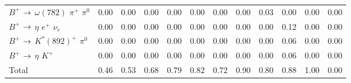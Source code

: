 {\begin{tabular}{lrrrrrrrrrrr}
$B^{+}$ $\rightarrow$ $\omega(782)$ $\pi^{+}$ $\pi^{0}$                      &         0.00 &         0.00 &         0.00 &         0.00 &         0.00 &         0.00 &         0.00 &         0.03 &         0.00 &         0.00 &         0.00 \\
$B^{+}$ $\rightarrow$ $\eta$ $e^{+}$ $\nu_{e}$                               &         0.00 &         0.00 &         0.00 &         0.00 &         0.00 &         0.00 &         0.00 &         0.00 &         0.12 &         0.00 &         0.00 \\
$B^{+}$ $\rightarrow$ $K^{*}(892)^{+}$ $\pi^{0}$                             &         0.00 &         0.00 &         0.00 &         0.00 &         0.00 &         0.00 &         0.00 &         0.00 &         0.06 &         0.00 &         0.00 \\
$B^{+}$ $\rightarrow$ $\eta$ $K^{+}$                                         &         0.00 &         0.00 &         0.00 &         0.00 &         0.00 &         0.00 &         0.00 &         0.00 &         0.06 &         0.00 &         0.00 \\
\hline
Total                                                                &         0.46 &         0.53 &         0.68 &         0.79 &         0.82 &         0.72 &         0.90 &         0.80 &         0.88 &         1.00 &         0.00 \\
\hline
\end{tabular}
}